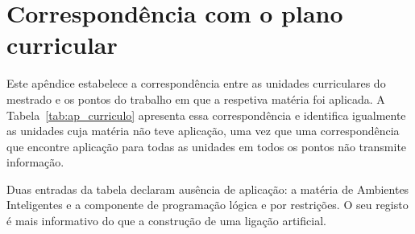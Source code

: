\chapter{Correspondência com o plano curricular}
\label{ap:curriculo}

Este apêndice estabelece a correspondência entre as unidades curriculares do mestrado e os pontos do
trabalho em que a respetiva matéria foi aplicada. A Tabela~\ref{tab:ap_curriculo} apresenta essa
correspondência e identifica igualmente as unidades cuja matéria não teve aplicação, uma vez que uma
correspondência que encontre aplicação para todas as unidades em todos os pontos não transmite
informação.

Duas entradas da tabela declaram ausência de aplicação: a matéria de Ambientes Inteligentes e a
componente de programação lógica e por restrições. O seu registo é mais informativo do que a
construção de uma ligação artificial.

